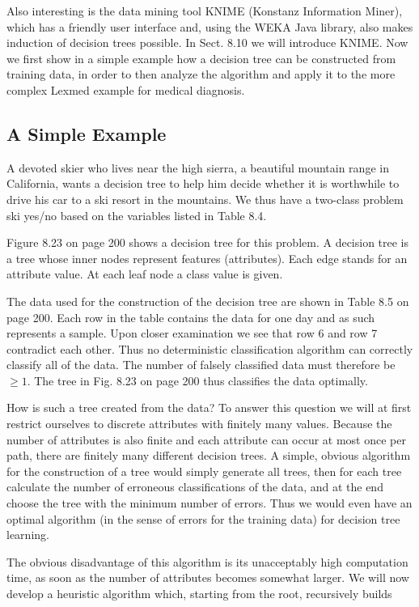 \documentclass[10pt]{book}
\begin{document}
Also interesting is the data mining tool KNIME (Konstanz Information Miner), which has a friendly user interface and, using the WEKA Java library, also makes induction of decision trees possible. In Sect. 8.10 we will introduce KNIME.
Now we first show in a simple example how a decision tree can be constructed from training data, in order to then analyze the algorithm and apply it to the more complex Lexmed example for medical diagnosis.

\subsection{A Simple Example}
A devoted skier who lives near the high sierra, a beautiful mountain range in California, wants a decision tree to help him decide whether it is worthwhile to drive his car to a ski resort in the mountains. We thus have a two-class problem ski yes/no based on the variables listed in Table 8.4.

Figure 8.23 on page 200 shows a decision tree for this problem. A decision tree is a tree whose inner nodes represent features (attributes). Each edge stands for an attribute value. At each leaf node a class value is given.

The data used for the construction of the decision tree are shown in Table 8.5 on page 200. Each row in the table contains the data for one day and as such represents a sample. Upon closer examination we see that row 6 and row 7 contradict each other. Thus no deterministic classification algorithm can correctly classify all of the data. The number of falsely classified data must therefore be $\geq 1$. The tree in Fig. 8.23 on page 200 thus classifies the data optimally.

How is such a tree created from the data? To answer this question we will at first restrict ourselves to discrete attributes with finitely many values. Because the number of attributes is also finite and each attribute can occur at most once per path, there are finitely many different decision trees. A simple, obvious algorithm for the construction of a tree would simply generate all trees, then for each tree calculate the number of erroneous classifications of the data, and at the end choose the tree with the minimum number of errors. Thus we would even have an optimal algorithm (in the sense of errors for the training data) for decision tree learning.

The obvious disadvantage of this algorithm is its unacceptably high computation time, as soon as the number of attributes becomes somewhat larger. We will now develop a heuristic algorithm which, starting from the root, recursively builds
\end{document}
